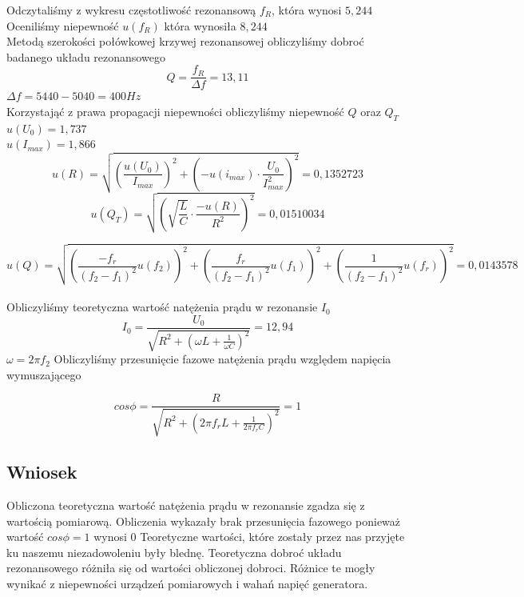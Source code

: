 \documentclass{article}
\begin{document}
Odczytaliśmy z wykresu częstotliwość rezonansową $f_R$, która wynosi $5,244$\\
Oceniliśmy niepewność $u(f_R)$ która wynosiła $8,244$\\
Metodą szerokości połówkowej krzywej rezonansowej obliczyliśmy dobroć badanego układu rezonansowego 
$$Q=\frac{f_R}{\Delta f} = 13,11$$
$\Delta f = 5440-5040=400Hz$\\
Korzystająć z prawa propagacji niepewności obliczyliśmy niepewność $Q$ oraz $Q_T$\\
$u(U_0)=1,737$\\
$u(I_{max})= 1,866$\\																
$$u(R) = \sqrt{(\frac{u(U_0)}{I_{max}})^2 + (-u(i_{max})\cdot \frac{U_0}{I_{max}^2})^2  } = 0,1352723 $$
$$u(Q_T)= \sqrt{(\sqrt{\frac{L}{C}}\cdot\frac{-u(R)}{R^2})^2} = 0,01510034$$

$$u(Q)=\sqrt{(\frac{-f_r}{(f_2-f_1)^2}u(f_2))^2 + (\frac{f_r}{(f_2-f_1)^2}u(f_1))^2 + (\frac{1}{(f_2-f_1)^2}u(f_r))^2 }= 0,0143578$$\\
Obliczyliśmy teoretyczna  wartość natężenia prądu w rezonansie $I_0$ 
$$I_0= \frac{U_0}{\sqrt{R^2+(\omega L+\frac{1}{\omega C})^2}}=12,94$$
$\omega= 2\pi f_2$
Obliczyliśmy przesunięcie fazowe natężenia prądu względem napięcia wymuszającego

$$cos\phi = \frac{R}{\sqrt{R^2+(2\pi f_r L + \frac{1}{2\pi f_rC})^2}}=1$$

\subsection{Wniosek}
Obliczona teoretyczna wartość natężenia prądu w rezonansie zgadza się z wartością pomiarową. Obliczenia wykazały brak przesunięcia fazowego ponieważ wartość $cos\phi=1$ wynosi $0$
Teoretyczne wartości, które zostały przez nas przyjęte ku naszemu niezadowoleniu były blednę.
Teoretyczna dobroć układu rezonansowego różniła się od wartości obliczonej dobroci.  
Różnice te mogły wynikać z niepewności urządzeń pomiarowych i wahań napięć generatora. 
\end{document}
